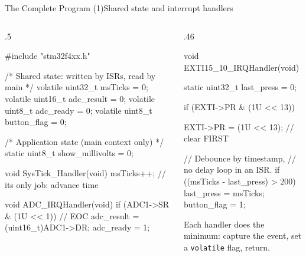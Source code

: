 \documentclass[9pt,aspectratio=169,xcolor=table]{beamer}
\begin{document}
\begin{frame}[fragile]{The Complete Program (1)}{Shared state and interrupt handlers}
    \begin{columns}[T]
    \begin{column}{.5\textwidth}
\begin{cc}[basicstyle=\ttfamily\scriptsize]
#include "stm32f4xx.h"

/* Shared state: written by ISRs, read by main */
volatile uint32_t msTicks     = 0;
volatile uint16_t adc_result  = 0;
volatile uint8_t  adc_ready   = 0;
volatile uint8_t  button_flag = 0;

/* Application state (main context only) */
static uint8_t show_millivolts = 0;

void SysTick_Handler(void) {
    msTicks++;      // its only job: advance time
}

void ADC_IRQHandler(void) {
    if (ADC1->SR & (1U << 1)) {   // EOC
        adc_result = (uint16_t)ADC1->DR;
        adc_ready  = 1;
    }
}
\end{cc}
    \end{column}
    \begin{column}{.46\textwidth}
\begin{cc}[basicstyle=\ttfamily\scriptsize]
void EXTI15_10_IRQHandler(void) {
    static uint32_t last_press = 0;

    if (EXTI->PR & (1U << 13)) {
        EXTI->PR = (1U << 13);  // clear FIRST

        // Debounce by timestamp,
        // no delay loop in an ISR.
        if ((msTicks - last_press) > 200) {
            last_press  = msTicks;
            button_flag = 1;
        }
    }
}
\end{cc}
        \vspace{1mm}
        {\small Each handler does the \alert{minimum}: capture the event, set a \texttt{volatile} flag, return.}
    \end{column}
    \end{columns}
\end{frame}
\end{document}
